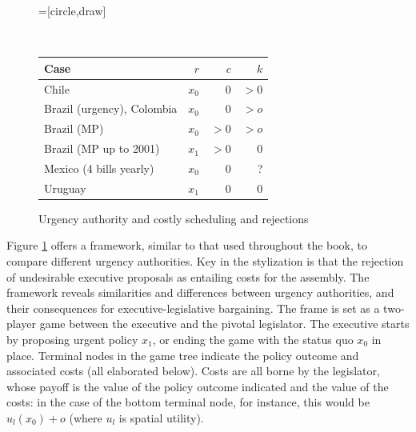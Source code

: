 \documentclass[letter,12pt]{article}
\begin{document}
\begin{figure}
  \centering
    =[circle,draw]
      \\
 \footnotesize{
 \begin{tabular}{lrrr}
  Case                       & $r$   & $c$   & $k$      \\ \hline
  Chile                      & $x_0$ & 0     & $>0$     \\
  Brazil (urgency), Colombia & $x_0$ & 0     & $> o$    \\
  Brazil (MP)                & $x_0$ & $>0$  & $> o$    \\
  Brazil (MP up to 2001)     & $x_1$ & $>0$  & 0        \\
  Mexico (4 bills yearly)    & $x_0$ & 0     & ?        \\
  Uruguay                    & $x_1$ & 0     & 0        \\
  \end{tabular}
  }
\caption{Urgency authority and costly scheduling and rejections}\label{f:costly}
\end{figure}

Figure \ref{f:costly} offers a framework, similar to that used throughout the book, to compare different urgency authorities. Key in the stylization is that the rejection of undesirable executive proposals as entailing costs for the assembly. The framework reveals similarities and differences between urgency authorities, and their consequences for executive-legislative bargaining. The frame is set as a two-player game between the executive and the pivotal legislator. The executive starts by proposing urgent policy $x_1$, or ending the game with the status quo $x_0$ in place. Terminal nodes in the game tree indicate the policy outcome and associated costs (all elaborated below). Costs are all borne by the legislator, whose payoff is the value of the policy outcome indicated and the value of the costs: in the case of the bottom terminal node, for instance, this would be $u_l(x_0)+o$ (where $u_l$ is spatial utility). 
\end{document}
